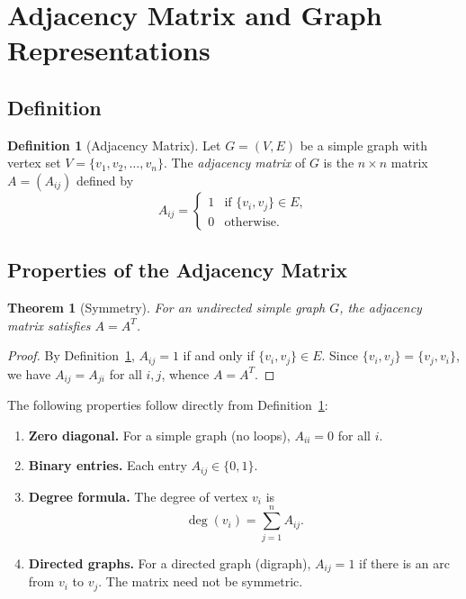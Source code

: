 \documentclass[12pt,a4paper]{article}
\theoremstyle{definition}
\newtheorem{definition}{Definition}[section]
\theoremstyle{plain}
\newtheorem{theorem}{Theorem}[section]
\theoremstyle{remark}
\begin{document}
\section{Adjacency Matrix and Graph Representations}
\label{sec:adjacency}

\subsection{Definition}

\begin{definition}[Adjacency Matrix]\label{def:adj-matrix}
Let $G = (V, E)$ be a simple graph with vertex set $V = \{v_1, v_2, \ldots, v_n\}$.
The \emph{adjacency matrix} of $G$ is the $n \times n$ matrix $A = (A_{ij})$ defined by
\begin{equation}\label{eq:adj-def}
  A_{ij} =
  \begin{cases}
    1 & \text{if } \{v_i, v_j\} \in E,\\
    0 & \text{otherwise.}
  \end{cases}
\end{equation}
\end{definition}

\subsection{Properties of the Adjacency Matrix}

\begin{theorem}[Symmetry]\label{thm:adj-symmetric}
For an undirected simple graph $G$, the adjacency matrix satisfies $A = A^T$.
\end{theorem}

\begin{proof}
By Definition~\ref{def:adj-matrix}, $A_{ij} = 1$ if and only if $\{v_i, v_j\} \in E$.
Since $\{v_i, v_j\} = \{v_j, v_i\}$, we have $A_{ij} = A_{ji}$ for all $i, j$, whence
$A = A^T$.
\end{proof}

The following properties follow directly from Definition~\ref{def:adj-matrix}:

\begin{enumerate}
  \item \textbf{Zero diagonal.} For a simple graph (no loops), $A_{ii} = 0$ for all $i$.
  \item \textbf{Binary entries.} Each entry $A_{ij} \in \{0,1\}$.
  \item \textbf{Degree formula.} The degree of vertex $v_i$ is
        \begin{equation}\label{eq:degree-sum}
          \deg(v_i) = \sum_{j=1}^{n} A_{ij}.
        \end{equation}
  \item \textbf{Directed graphs.} For a directed graph (digraph), $A_{ij} = 1$ if there
        is an arc from $v_i$ to $v_j$. The matrix need not be symmetric.
\end{enumerate}
\end{document}
